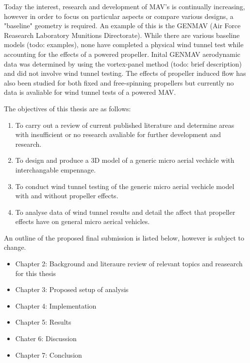 \label{subsec:The General Micro Aerial Vechicle}
Today the interest, research and development of MAV's is continually increasing, however in order to focus on particular aspects or compare various designs, a "baseline" geometry is required. An example of this is the GENMAV (Air Force Reasearch Laboratory Munitions Directorate). While there are various baseline models (todo: examples), none have completed a physical wind tunnel test while accounting for the effects of a powered propeller. Inital GENMAV aerodynamic data was determined by using the vortex-panel method (todo: brief description) and did not involve wind tunnel testing. The effects of propeller induced flow has also been studied for both fixed and free-spinning propellers but currently no data is avaliable for wind tunnel tests of a powered MAV.

\label{subsec:Optimization Techniques and Validation}


\label{sec:Problem Statement}





\label{sec:Objectives}
The objectives of this thesis are as follows:

\begin{enumerate}
  \item To carry out a review of current published literature and determine areas with insufficient or no research avaliable for further development and research.
  \item To design and produce a 3D model of a generic micro aerial vechicle with interchangable empennage.
  \item To conduct wind tunnel testing of the generic micro aerial vechicle model with and without propeller effects.
  \item To analyse data of wind tunnel results and detail the affect that propeller effects have on general micro aerical vehicles.
\end{enumerate}

\label{sec:Outline}
An outline of the proposed final submission is listed below, however is subject to change.

\begin{itemize}
  \item Chapter 2: Background and literaure review of relevant topics and reasearch for this thesis
  \item Chapter 3: Proposed setup of analysis
  \item Chapter 4: Implementation
  \item Chapter 5: Results
  \item Chater 6: Discussion
  \item Chapter 7: Conclusion
\end{itemize}




